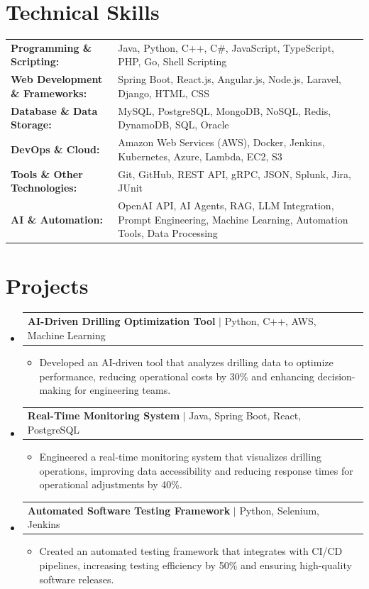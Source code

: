 \documentclass[letterpaper,10pt]{article}
\makeatletter
\newcommand{\resumeItem}[1]{
  \item{\fontsize{8pt}{9pt}\selectfont
    #1 \vspace{-3pt}
  }
}
\newcommand{\resumeProjectHeading}[2]{
    \item
    \begin{tabular*}{1.001\textwidth}{l@{\extracolsep{\fill}}r}
      \fontsize{8.5pt}{10pt}#1 & \textbf{\fontsize{8.5pt}{10pt} #2}\\
    \end{tabular*}\vspace{-7pt}
}
\newcommand{\resumeSubHeadingListStart}{\begin{itemize}[leftmargin=0pt, label={}]}
\newcommand{\resumeSubHeadingListEnd}{\end{itemize}}
\newcommand{\resumeItemListStart}{\begin{itemize}[leftmargin=*]}
\newcommand{\resumeItemListEnd}{\end{itemize}\vspace{-5pt}}
\makeatother
\begin{document}
\section{Technical Skills}
        \vspace{-14pt}
        \begin{table}[h]
            \fontsize{8pt}{9pt}\selectfont
            \begin{tabular}{p{0.3\linewidth} p{0.7\linewidth}}
                \textbf{Programming \& Scripting:} & Java, Python, C++, C\#, JavaScript, TypeScript, PHP, Go, Shell Scripting \\
                \textbf{Web Development \& Frameworks:} & Spring Boot, React.js, Angular.js, Node.js, Laravel, Django, HTML, CSS \\
                \textbf{Database \& Data Storage:} & MySQL, PostgreSQL, MongoDB, NoSQL, Redis, DynamoDB, SQL, Oracle \\
                \textbf{DevOps \& Cloud:} & Amazon Web Services (AWS), Docker, Jenkins, Kubernetes, Azure, Lambda, EC2, S3 \\
                \textbf{Tools \& Other Technologies:} & Git, GitHub, REST API, gRPC, JSON, Splunk, Jira, JUnit \\
                \textbf{AI \& Automation:} & OpenAI API, AI Agents, RAG, LLM Integration, Prompt Engineering, Machine Learning, Automation Tools, Data Processing \\
            \end{tabular}
        \end{table}
 \vspace{-18pt}

\section{Projects}
    \vspace{-5pt}
    \resumeSubHeadingListStart
          \resumeProjectHeading
            {\textbf{AI-Driven Drilling Optimization Tool} $|$ Python, C++, AWS, Machine Learning}{}
            \resumeItemListStart
                \resumeItem{Developed an AI-driven tool that analyzes drilling data to optimize performance, reducing operational costs by 30\% and enhancing decision-making for engineering teams.}
            \resumeItemListEnd
        \vspace{-12pt}
    
        \resumeProjectHeading
            {\textbf{Real-Time Monitoring System} $|$ Java, Spring Boot, React, PostgreSQL}{}
        \resumeItemListStart
                \resumeItem{Engineered a real-time monitoring system that visualizes drilling operations, improving data accessibility and reducing response times for operational adjustments by 40\%.}
        \resumeItemListEnd
      \vspace{-12pt}
      \resumeProjectHeading
        {\textbf{Automated Software Testing Framework} $|$ Python, Selenium, Jenkins}{}
    \resumeItemListStart
            \resumeItem{Created an automated testing framework that integrates with CI/CD pipelines, increasing testing efficiency by 50\% and ensuring high-quality software releases.}
    \resumeItemListEnd
    \resumeSubHeadingListEnd
\end{document}
